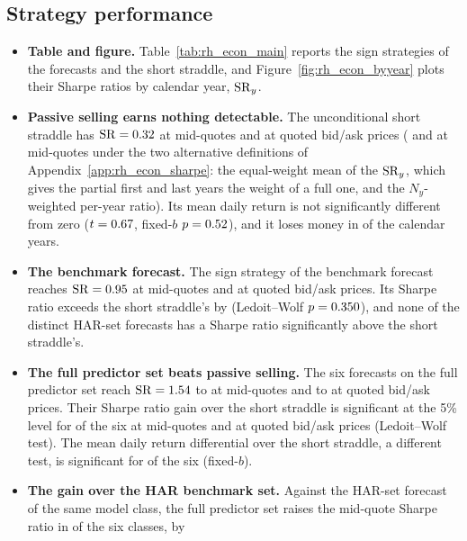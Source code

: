 \subsection{Strategy performance}
\label{sec:rh_econ_results}
\begin{itemize}
\item \textbf{Table and figure.} Table~\ref{tab:rh_econ_main} reports the sign strategies of the \rhrPoolN{}
  forecasts and the short straddle, and Figure~\ref{fig:rh_econ_byyear} plots their Sharpe ratios by calendar year,
  $\mathrm{SR}_y$.
\item \textbf{Passive selling earns nothing detectable.} The unconditional short straddle has $\mathrm{SR} = 0.32$ at
  mid-quotes and \rheShortShX{} at quoted bid/ask prices (\rhemShDSixShort{} and \rhemShDOneShort{} at mid-quotes
  under the two alternative definitions of Appendix~\ref{app:rh_econ_sharpe}: the equal-weight mean of the $\mathrm{SR}_y$,
  which gives the partial first and last years the weight of a full one, and the $N_y$-weighted per-year ratio). Its
  mean daily return is not significantly different from zero ($t = 0.67$, fixed-$b$ $p = 0.52$), and it
  loses money in \rheShortLossYears{} of the \rheNYears{} calendar years.
\item \textbf{The benchmark forecast.} The sign strategy of the benchmark forecast reaches $\mathrm{SR} = 0.95$ at
  mid-quotes and \rhemShXRidgeHar{} at quoted bid/ask prices. Its Sharpe ratio exceeds the short straddle's by
  \rhemDShRidgeHarVsShort{} (Ledoit--Wolf $p = 0.350$), and none of the \rhemHarDistinctWord{}
  distinct HAR-set forecasts has a Sharpe ratio significantly above the short straddle's.
\item \textbf{The full predictor set beats passive selling.} The six forecasts on the full predictor set reach
  $\mathrm{SR} = 1.54$ to \rhrPoolShFullMax{} at mid-quotes and \rhrPoolShXFullMin{} to \rhrPoolShXFullMax{} at
  quoted bid/ask prices. Their Sharpe ratio gain over the short straddle is significant at the 5\% level for
  \rhemFullVsShortSigWord{} of the six at mid-quotes and \rhemFullVsShortSigXWord{} at quoted bid/ask prices
  (Ledoit--Wolf test). The mean daily return differential over the short straddle, a different test, is significant
  for \rhemFullTVsShortSigWord{} of the six (fixed-$b$).
\item \textbf{The gain over the HAR benchmark set.} Against the HAR-set forecast of the same model class, the full
  predictor set raises the mid-quote Sharpe ratio in \rhemFullVsHarPosWord{} of the six classes, by

\end{itemize}
